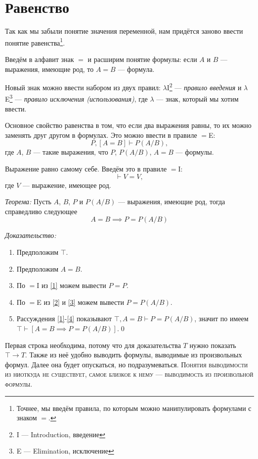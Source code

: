\section{Равенство}

Так как мы забыли понятие значения переменной,
нам придётся заново ввести понятие равенства\footnote{
	Точнее, мы введём правила, по которым можно манипулировать
	формулами с знаком $=$.
}.

Введём в алфавит знак $=$ и расширим понятие формулы: если $A$ и $B$ --- выражения,
имеющие род, то $A=B$ --- формула.

Новый знак можно ввести набором из двух правил:
$\lambda$I\footnote{I --- Introduction, введение} --- {\it правило введения}
и $\lambda$E\footnote{E --- Elimination, исключение} --- {\it правило
исключения (использования)}, где $\lambda$ --- знак, который мы хотим ввести.

\pagebreak

Основное свойство равенства в том, что если два выражения равны, то их можно
заменять друг другом в формулах. Это можно ввести в правиле $=$E:
\[
	P,[A=B]\vdash P(A/B),
\]
где $A$, $B$ --- такие выражения, что $P$, $P(A/B)$, $A=B$ --- формулы.

Выражение равно самому себе. Введём это в правиле $=$I:
\[
	\vdash V=V,
\]
где $V$ --- выражение, имеющее род.

{\it Теорема:} Пусть $A$, $B$, $P$ и $P(A/B)$ --- выражения, имеющие род,
тогда справедливо следующее
\[
	A=B\implies P=P(A/B)
\]

{\it Доказательство:}
\begin{enumerate}[label=(\arabic*)]
	\item{}\label{1}Предположим $\top$.
	\item{}\label{2}Предположим $A=B$.
	\item{}\label{3}По $=$I из \ref{1} можем вывести $P=P$.
	\item{}\label{4}По $=$E из \ref{2} и \ref{3} можем вывести $P=P(A/B)$.
	\item{}\label{5}Рассуждения \ref{1}-\ref{4} показывают $\top,A=B\vdash P=P(A/B)$,
	значит по \implic{} имеем $\top\vdash [A=B\implies P=P(A/B)]$.\qed
\end{enumerate}

Первая строка необходима, потому что для доказательства
$T$ нужно показать $\top\to T$. Также из неё удобно выводить формулы,
выводимые из произвольных формул. Далее она будет опускаться,
но подразумеваться.
\textsc{Понятия выводимости из ниоткуда не существует,
	самое близкое к нему --- выводимость из произвольной формулы.}

